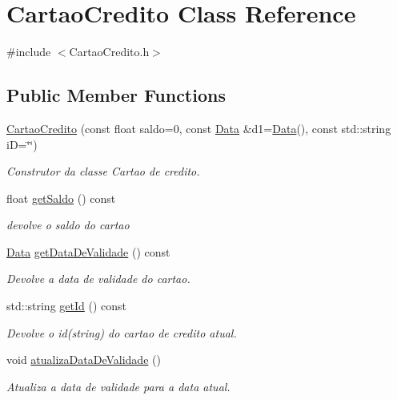 \hypertarget{classCartaoCredito}{}\section{Cartao\+Credito Class Reference}
\label{classCartaoCredito}


{\ttfamily \#include $<$Cartao\+Credito.\+h$>$}

\subsection*{Public Member Functions}
\begin{DoxyCompactItemize}
\item 
\hyperlink{classCartaoCredito_a49b6298290f8307df4a42b15175fb10f}{Cartao\+Credito} (const float saldo=0, const \hyperlink{classData}{Data} \&d1=\hyperlink{classData}{Data}(), const std\+::string iD=\char`\"{}\char`\"{})
\begin{DoxyCompactList}\small\item\em Construtor da classe Cartao de credito. \end{DoxyCompactList}\item 
float \hyperlink{classCartaoCredito_a5d10788d907961f86779efaecb6a231d}{get\+Saldo} () const
\begin{DoxyCompactList}\small\item\em devolve o saldo do cartao \end{DoxyCompactList}\item 
\hyperlink{classData}{Data} \hyperlink{classCartaoCredito_ab28b73bbecc20b5c23348e1172230533}{get\+Data\+De\+Validade} () const
\begin{DoxyCompactList}\small\item\em Devolve a data de validade do cartao. \end{DoxyCompactList}\item 
std\+::string \hyperlink{classCartaoCredito_ab59d60e4d155e7f29aef888ea3139ee5}{get\+Id} () const
\begin{DoxyCompactList}\small\item\em Devolve o id(string) do cartao de credito atual. \end{DoxyCompactList}\item 
void \hyperlink{classCartaoCredito_a52daaab859e37d416c00044ef0fb2f27}{atualiza\+Data\+De\+Validade} ()
\begin{DoxyCompactList}\small\item\em Atualiza a data de validade para a data atual. \end{DoxyCompactList}\item 

\end{DoxyCompactItemize}
